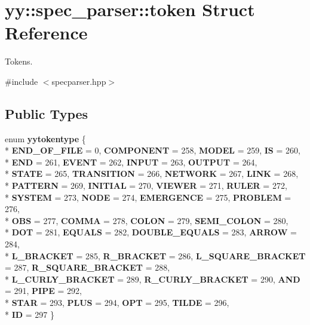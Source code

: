 \hypertarget{structyy_1_1spec__parser_1_1token}{}\section{yy\+:\+:spec\+\_\+parser\+:\+:token Struct Reference}
\label{structyy_1_1spec__parser_1_1token}


Tokens.  




{\ttfamily \#include $<$specparser.\+hpp$>$}

\subsection*{Public Types}
\begin{DoxyCompactItemize}
\item 
enum {\bfseries yytokentype} \{ \\*
{\bfseries E\+N\+D\+\_\+\+O\+F\+\_\+\+F\+I\+LE} = 0, 
{\bfseries C\+O\+M\+P\+O\+N\+E\+NT} = 258, 
{\bfseries M\+O\+D\+EL} = 259, 
{\bfseries IS} = 260, 
\\*
{\bfseries E\+ND} = 261, 
{\bfseries E\+V\+E\+NT} = 262, 
{\bfseries I\+N\+P\+UT} = 263, 
{\bfseries O\+U\+T\+P\+UT} = 264, 
\\*
{\bfseries S\+T\+A\+TE} = 265, 
{\bfseries T\+R\+A\+N\+S\+I\+T\+I\+ON} = 266, 
{\bfseries N\+E\+T\+W\+O\+RK} = 267, 
{\bfseries L\+I\+NK} = 268, 
\\*
{\bfseries P\+A\+T\+T\+E\+RN} = 269, 
{\bfseries I\+N\+I\+T\+I\+AL} = 270, 
{\bfseries V\+I\+E\+W\+ER} = 271, 
{\bfseries R\+U\+L\+ER} = 272, 
\\*
{\bfseries S\+Y\+S\+T\+EM} = 273, 
{\bfseries N\+O\+DE} = 274, 
{\bfseries E\+M\+E\+R\+G\+E\+N\+CE} = 275, 
{\bfseries P\+R\+O\+B\+L\+EM} = 276, 
\\*
{\bfseries O\+BS} = 277, 
{\bfseries C\+O\+M\+MA} = 278, 
{\bfseries C\+O\+L\+ON} = 279, 
{\bfseries S\+E\+M\+I\+\_\+\+C\+O\+L\+ON} = 280, 
\\*
{\bfseries D\+OT} = 281, 
{\bfseries E\+Q\+U\+A\+LS} = 282, 
{\bfseries D\+O\+U\+B\+L\+E\+\_\+\+E\+Q\+U\+A\+LS} = 283, 
{\bfseries A\+R\+R\+OW} = 284, 
\\*
{\bfseries L\+\_\+\+B\+R\+A\+C\+K\+ET} = 285, 
{\bfseries R\+\_\+\+B\+R\+A\+C\+K\+ET} = 286, 
{\bfseries L\+\_\+\+S\+Q\+U\+A\+R\+E\+\_\+\+B\+R\+A\+C\+K\+ET} = 287, 
{\bfseries R\+\_\+\+S\+Q\+U\+A\+R\+E\+\_\+\+B\+R\+A\+C\+K\+ET} = 288, 
\\*
{\bfseries L\+\_\+\+C\+U\+R\+L\+Y\+\_\+\+B\+R\+A\+C\+K\+ET} = 289, 
{\bfseries R\+\_\+\+C\+U\+R\+L\+Y\+\_\+\+B\+R\+A\+C\+K\+ET} = 290, 
{\bfseries A\+ND} = 291, 
{\bfseries P\+I\+PE} = 292, 
\\*
{\bfseries S\+T\+AR} = 293, 
{\bfseries P\+L\+US} = 294, 
{\bfseries O\+PT} = 295, 
{\bfseries T\+I\+L\+DE} = 296, 
\\*
{\bfseries ID} = 297
 \}\hypertarget{structyy_1_1spec__parser_1_1token_a4ad9c872d99257017f8c0f546438f8d1}{}\label{structyy_1_1spec__parser_1_1token_a4ad9c872d99257017f8c0f546438f8d1}

\end{DoxyCompactItemize}


